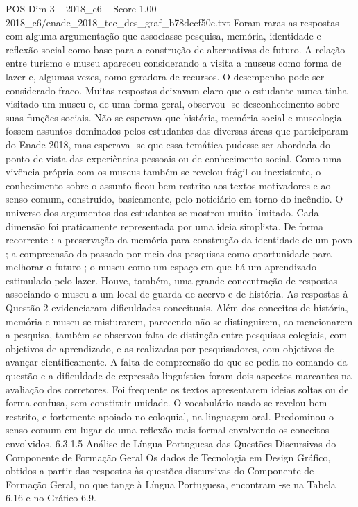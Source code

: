 \begin{textsample}{POS Dim 3 – 2018\_c6 – Score 1.00 – 2018\_c6/enade\_2018\_tec\_des\_graf\_b78dccf50c.txt}
Foram raras as respostas com alguma argumentação que associasse pesquisa, memória, identidade e reflexão social como base para a construção de alternativas de futuro.
A relação entre turismo e museu apareceu considerando a visita a museus como forma de lazer e, algumas vezes, como geradora de recursos.
O desempenho pode ser considerado fraco.
Muitas respostas deixavam claro que o estudante nunca tinha visitado um museu e, de uma forma geral, observou -se desconhecimento sobre suas funções sociais.
Não se esperava que história, memória social e museologia fossem assuntos dominados pelos estudantes das diversas áreas que participaram do Enade 2018, mas esperava -se que essa temática pudesse ser abordada do ponto de vista das experiências pessoais ou de conhecimento social.
Como uma vivência própria com os museus também se revelou frágil ou inexistente, o conhecimento sobre o assunto ficou bem restrito aos textos motivadores e ao senso comum, construído, basicamente, pelo noticiário em torno do incêndio.
O universo dos argumentos dos estudantes se mostrou muito limitado.
Cada dimensão foi praticamente representada por uma ideia simplista.
De forma recorrente : a preservação da memória para construção da identidade de um povo ; a compreensão do passado por meio das pesquisas como oportunidade para melhorar o futuro ; o museu como um espaço em que há um aprendizado estimulado pelo lazer.
Houve, também, uma grande concentração de respostas associando o museu a um local de guarda de acervo e de história.
As respostas à Questão 2 evidenciaram dificuldades conceituais.
Além dos conceitos de história, memória e museu se misturarem, parecendo não se distinguirem, ao mencionarem a pesquisa, também se observou falta de distinção entre pesquisas colegiais, com objetivos de aprendizado, e as realizadas por pesquisadores, com objetivos de avançar cientificamente.
A falta de compreensão do que se pedia no comando da questão e a dificuldade de expressão linguística foram dois aspectos marcantes na avaliação dos corretores.
Foi frequente os textos apresentarem ideias soltas ou de forma confusa, sem constituir unidade.
O vocabulário usado se revelou bem restrito, e fortemente apoiado no coloquial, na linguagem oral.
Predominou o senso comum em lugar de uma reflexão mais formal envolvendo os conceitos envolvidos. 6.3.1.5 Análise de Língua Portuguesa das Questões Discursivas do Componente de Formação Geral Os dados de Tecnologia em Design Gráfico, obtidos a partir das respostas às questões discursivas do Componente de Formação Geral, no que tange à Língua Portuguesa, encontram -se na Tabela 6.16 e no Gráfico 6.9.

\end{textsample}
